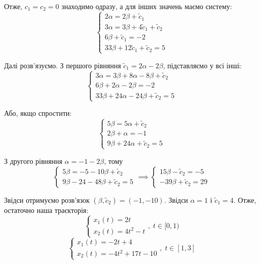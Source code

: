 \documentclass[oneside,solution]{karazin-control-assign}
\begin{document}
Отже, $c_1=c_2=0$ знаходимо одразу, а для інших значень маємо систему:
\begin{equation}
    \begin{cases}
        2\alpha = 2\beta + \widetilde{c}_1 \\
        3\alpha = 3\beta + 4\widetilde{c}_1 + \widetilde{c}_2 \\
        6\beta + \widetilde{c}_1 = -2 \\
        33\beta + 12\widetilde{c}_1 + \widetilde{c}_2 = 5
    \end{cases}
\end{equation}

Далі розв'язуємо. З першого рівняння $\widetilde{c}_1 = 2\alpha-2\beta$, підставляємо у всі інші:
\begin{equation}
    \begin{cases}
        3\alpha = 3\beta + 8\alpha - 8\beta + \widetilde{c}_2 \\
        6\beta + 2\alpha-2\beta = -2 \\
        33\beta + 24\alpha - 24\beta + \widetilde{c}_2 = 5
    \end{cases}
\end{equation}

Або, якщо спростити:
\begin{equation}
    \begin{cases}
        5\beta = 5\alpha + \widetilde{c}_2 \\
        2\beta + \alpha = -1 \\
        9\beta + 24\alpha + \widetilde{c}_2 = 5
    \end{cases}
\end{equation}

З другого рівняння $\alpha=-1-2\beta$, тому
\begin{equation}
    \begin{cases}
        5\beta = -5-10\beta + \widetilde{c}_2 \\
        9\beta - 24 - 48\beta + \widetilde{c}_2 = 5
    \end{cases} \implies \begin{cases}
        15\beta - \widetilde{c}_2 = -5 \\
        -39\beta + \widetilde{c}_2 = 29
    \end{cases}
\end{equation}

Звідси отримуємо розв'язок $(\beta,\widetilde{c}_2)=(-1,-10)$. Звідси $\alpha=1$ і $\widetilde{c}_1 = 4$. Отже, остаточно наша траєкторія:
\begin{equation}
    \begin{cases}
        x_1(t) = 2t \\
        x_2(t) = 4t^2 - t 
    \end{cases}, \; t \in [0,1)
\end{equation}
\begin{equation}
    \begin{cases}
        x_1(t) = -2t + 4 \\
        x_2(t) = -4t^2 + 17t - 10
    \end{cases}, \; t \in [1,3]
\end{equation}
\end{document}
